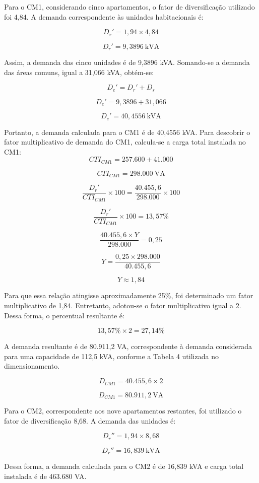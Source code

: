 \documentclass[12pt,openright,oneside,a4paper,brazil]{abntex2}
\begin{document}
Para o CM1, considerando cinco apartamentos, o fator de diversificação utilizado foi 4,84. A demanda correspondente às unidades habitacionais é:

\[
D_r' = 1,94 \times 4,84
\]

\[
D_r' = 9,3896\ \mathrm{kVA}
\]

Assim, a demanda das cinco unidades é de 9,3896 kVA. Somando-se a demanda das áreas comuns, igual a 31,066 kVA, obtém-se:

\[
D_e' = D_r' + D_s
\]

\[
D_e' = 9,3896 + 31,066
\]

\[
D_e' = 40,4556\ \mathrm{kVA}
\]

Portanto, a demanda calculada para o CM1 é de 40,4556 kVA.
Para descobrir o fator multiplicativo de demanda do CM1, calcula-se a carga total instalada no CM1:
\[
CTI_{CM1} = 257.600 + 41.000
\]

\[
CTI_{CM1} = 298.000\ \mathrm{VA}
\]

\[
\frac{D_r'}{CTI_{CM1}} \times 100
=
\frac{40.455,6}{298.000} \times 100
\]

\[
\frac{D_r'}{CTI_{CM1}} \times 100
=
13,57\%
\]

\[
\frac{40.455,6 \times Y}{298.000} = 0,25
\]

\[
Y =
\frac{0,25 \times 298.000}{40.455,6}
\]

\[
Y \approx 1,84
\]

Para que essa relação atingisse aproximadamente 25\%, foi determinado um fator multiplicativo de 1,84. Entretanto, adotou-se o fator multiplicativo igual a 2. Dessa forma, o percentual resultante é:

\[
13,57\% \times 2 = 27,14\%
\]

A demanda resultante é de 80.911,2 VA, correspondente à demanda considerada para uma capacidade de 112,5 kVA, conforme a Tabela 4 utilizada no dimensionamento.

\[
D_{CM1} = 40.455,6 \times 2
\]

\[
D_{CM1} = 80.911,2\ \mathrm{VA}
\]

Para o CM2, correspondente aos nove apartamentos restantes, foi utilizado o fator de diversificação 8,68. A demanda das unidades é:

\[
D_r'' = 1,94 \times 8,68
\]

\[
D_r'' = 16,839\ \mathrm{kVA}
\]

Dessa forma, a demanda calculada para o CM2 é de 16,839 kVA e carga total instalada é de 463.680 VA.
\end{document}
